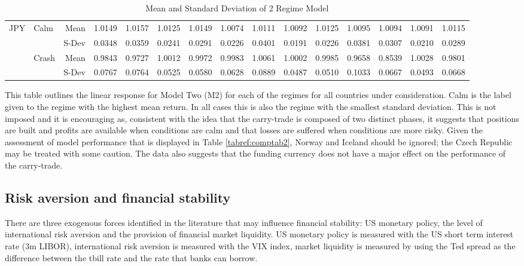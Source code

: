 \documentclass[12pt, a4paper, oneside]{article}\usepackage[]{graphicx}\usepackage[]{color}
\begin{document}
\begin{landscape}
\begin{table}[ht]
\begin{threeparttable}
\begin{tabular}{llrrrrrrrrrrrrr}
\hline  
  \multirow{4}{*}{JPY}&\multirow{2}{*}{Calm}& Mean& 1.0149 & 1.0157 & 1.0125 & 1.0149 & 1.0074 & 1.0111 & 1.0092 & 1.0125 & 1.0095 & 1.0094 & 1.0091 & 1.0115 \\ 
 & & S-Dev &0.0348 & 0.0359 & 0.0241 & 0.0291 & 0.0226 & 0.0401 & 0.0191 & 0.0226 & 0.0381 & 0.0307 & 0.0210 & 0.0289 \\ 
  & \multirow{2}{*}{Crash}&Mean & 0.9843 & 0.9727 & 1.0012 & 0.9972 & 0.9983 & 1.0061 & 1.0002 & 0.9985 & 0.9658 & 0.8539 & 1.0028 & 0.9801 \\ 
  & & S-Dev& 0.0767 & 0.0764 & 0.0525 & 0.0580 & 0.0628 & 0.0889 & 0.0487 & 0.0510 & 0.1033 & 0.0667 & 0.0493 & 0.0668 \\ 
   \hline
\end{tabular}
\begin{tablenotes}
\small
\item
This table outlines the linear response for Model Two (M2) for each of the regimes for all countries under consideration.  Calm is the label given to the regime with the highest mean return.  In all cases this is also the regime with the smallest standard deviation. This is not imposed and it is encouraging as, consistent with the idea that the carry-trade is composed of two distinct phases, it suggests that positions are built and profits are available when conditions are calm and that losses are suffered when conditions are more risky.  Given the assessment of model performance that is displayed in Table \ref{tabref:comptab2}, Norway and Iceland should be ignored; the Czech Republic may be treated with some caution.  The data also suggests that the funding currency does not have a major effect on the performance of the carry-trade.   
\end{tablenotes}
\caption{Mean and Standard Deviation of 2 Regime Model}
\label{tabref:2stateresponse}
\end{threeparttable}
\end{table}
\end{landscape}

\subsection{Risk aversion and financial stability}
There are three exogenous forces identified in the literature that may influence financial stability:  US monetary policy, the level of international risk aversion and the provision of financial market liquidity.  US monetary policy is measured with the US short term interest rate (3m LIBOR),  international risk aversion is measured with the VIX index, market liquidity is measured by using the Ted spread as the difference between the tbill rate and the rate that banks can borrow.   
\end{document}
